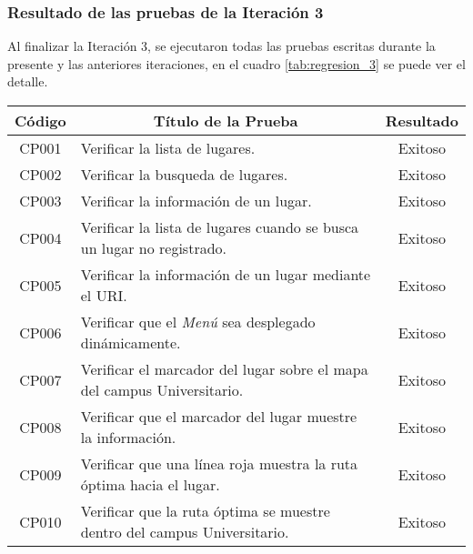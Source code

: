 \subsubsection{Resultado de las pruebas de la Iteración 3}

Al finalizar la Iteración 3, se ejecutaron todas las pruebas escritas durante la presente y las anteriores iteraciones, en el cuadro \ref{tab:regresion_3} se puede ver el detalle.


\begin{table}[H]
  \begin{center}
    \begin{tabularx}{0.8\textwidth}{ c  X  c }
      \toprule
        \textbf{Código} &
        \multicolumn{1}{c}{\textbf{Título de la Prueba}} &
        \textbf{Resultado}\\

\midrule
CP001
&
Verificar la lista de lugares.
&
Exitoso \\

CP002
&
Verificar la busqueda de lugares.
&
Exitoso \\

CP003
&
Verificar la información de un lugar.
&
Exitoso \\

CP004
&
Verificar la lista de lugares cuando se busca un lugar no registrado.
&
Exitoso \\

CP005
&
Verificar la información de un lugar mediante el URI.
&
Exitoso \\

CP006
&
Verificar que el \emph{Menú} sea desplegado dinámicamente.
&
Exitoso \\

CP007
&
Verificar el marcador del lugar sobre el mapa del campus Universitario.
&
Exitoso \\

CP008
&
Verificar que el marcador del lugar muestre la información.
&
Exitoso \\


CP009
&
Verificar que una línea roja muestra la ruta óptima hacia el lugar.
&
Exitoso \\

CP010
&
Verificar que la ruta óptima se muestre dentro del campus Universitario.
&
Exitoso \\



\end{tabularx}
\end{center}
\end{table}
